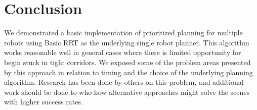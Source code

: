 \documentclass[12pt,journal,compsoc]{IEEEtran}
\begin{document}
%



\section{Conclusion}
We demonstrated a basic implementation of prioritized planning for multiple robots using Basic RRT as the underlying single robot planner. This algorithm works reasonable well in general cases where there is limited opportunity for begin stuck in tight corridors. We exposed some of the problem areas presented by this approach in relation to timing and the choice of the underlying planning algorithm. Research has been done by others on this problem, and additional work should be done to who how alternative approaches might solve the scenes with higher success rates.

\ifCLASSOPTIONcaptionsoff
  \newpage
\fi
\end{document}
